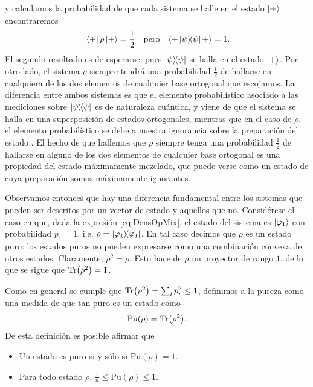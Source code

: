 y calculamos la probabilidad de que cada sistema se halle en el estado $\ket{+}$ encontraremos
\begin{align}
    \bra{+}\rho\ket{+}=\frac{1}{2} && \text{pero} &&\langle + \dyad{\psi} +\rangle=1\rlap{.}\nonumber
\end{align}
El segundo resultado es de esperarse, pues $\dyad{\psi}$ se halla en el estado $\ket{+}$. Por otro lado, el sistema $\rho$ siempre tendrá una probabilidad $\frac{1}{2}$ de hallarse en cualquiera de los dos elementos de cualquier base ortogonal que escojamos. La diferencia entre ambos sistemas es que el elemento probabilístico asociado a las mediciones sobre $\dyad{\psi}$ es de naturaleza cuántica, y viene de que el sistema se halla en una superposición de estados ortogonales, mientras que en el caso de $\rho$, el elemento probabilístico se debe a nuestra ignorancia sobre la preparación del estado \cite{Chuang}. El hecho de que hallemos que $\rho$ siempre tenga una probabilidad $\frac{1}{2}$ de hallarse en alguno de los dos elementos de cualquier base ortogonal es una propiedad del estado máximamente mezclado, que puede verse como un estado de cuya preparación somos máximamente ignorantes.



Observamos entonces que hay una diferencia fundamental entre los sistemas que pueden ser descritos por un vector de estado y aquellos que no. Considérese el caso en que, dada la expresión \ref{eq:DensOpMix}, el estado del sistema es $\ket{\varphi_{1}}$ con  probabilidad $p_{1}=1$, i.e. $\rho=\dyad{\varphi_{1}}$. En tal caso decimos que $\rho$ es un estado puro: los estados puros no pueden expresarse como una combinación convexa de otros estados. Claramente, $\rho^{2}=\rho$. Esto hace de $\rho$ un proyector de rango $1$, de lo que se sigue que $\Tr(\rho^{2})=1$.

Como en general se cumple que $\Tr(\rho^{2})=\sum_i p^2_i\leq 1$, definimos a la pureza como una medida de que tan puro es un estado como \cite{Jaeger}
\begin{equation}
    \text{Pu}(\rho)=\Tr(\rho^{2}).\nonumber
\end{equation}
De esta definición es posible afirmar que
\begin{itemize}
    \item Un estado es puro si y sólo si $\text{Pu}(\rho)=1$.
    \item Para todo estado $\rho$, $\frac{1}{n}\leq \text{Pu}(\rho)\leq 1$.
\end{itemize}

